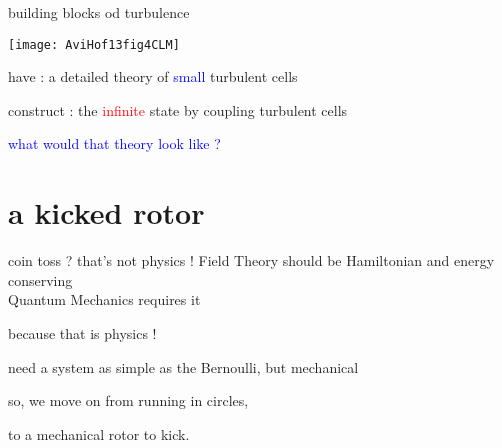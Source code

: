 \begin{frame}
  \titlepage
\end{frame} %

%

\begin{frame}{building blocks od turbulence}
\begin{center}
\texttt{[image: AviHof13fig4CLM]}
\end{center}
have : a detailed theory of {\small \textcolor{blue}{small}} turbulent cells

\bigskip

construct : the \textcolor{red}{infinite} state by coupling turbulent
cells
\vfill

\textcolor{blue}{what would that theory look like ?}
\end{frame} %

\renewcommand{\statesp}{phase space}


\section[a kicked rotor]
 {a kicked rotor}

\begin{frame}{coin toss ? that's not physics !}
Field Theory should be
Hamiltonian and energy conserving \\
Quantum Mechanics requires it

\hfill
because {\color{blue}that is physics} {\color{red}!}
\bigskip

need a system as simple
as the Bernoulli, but {\color{blue}mechanical}
\bigskip

so, we move on from running in circles,

\hfill
to a mechanical {\color{blue}rotor} to kick.
\end{frame} %

